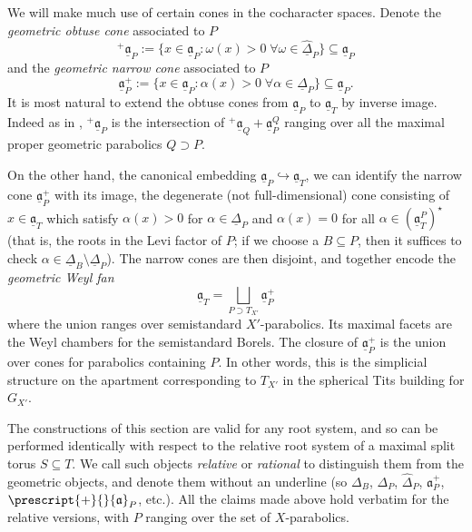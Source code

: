 \documentclass[openany]{amsbook}
\theoremstyle{definition}
\theoremstyle{remark}
\numberwithin{equation}{section}
\newcommand{\ul}[1]{\underline{#1}}
\renewcommand{\-}{\operatorname{-}}
\renewcommand{\a}{\mathfrak{a}}
\newcommand{\obtcone}{\prescript{+}{}{\a}}
\newcommand{\narcone}{\a^+}
\newcommand{\ga}{\ul{\a}}
\newcommand{\gobtcone}{{}^+ \ul{\a}}
\newcommand{\gnarcone}{\ul{\a}^+}
\begin{document}
We will make much use of certain cones in the cocharacter spaces. Denote the \emph{geometric obtuse cone} associated to $P$
$$
    \gobtcone_P := \{x \in \ga_P : \omega(x) > 0 \; \forall \omega \in \widehat{\ul{\Delta}}_P\} \subseteq \ga_P
$$
and the \emph{geometric narrow cone} associated to $P$
$$
    \gnarcone_P := \{x \in \ga_P : \alpha(x) > 0 \; \forall \alpha \in \ul{\Delta}_P\} \subseteq \ga_P.
$$
It is most natural to extend the obtuse cones from $\ga_P$ to $\ga_T$ by inverse image. Indeed as in \cite[Lemme 5.3.1]{CLI}, $\gobtcone_P$ is the intersection of $\gobtcone_Q + \ga_P^Q$ ranging over all the maximal proper geometric parabolics $Q \supset P$.

On the other hand, the canonical embedding $\ga_P \hookrightarrow \ga_T$, we can identify the narrow cone $\gnarcone_P$ with its image, the degenerate (not full-dimensional) cone consisting of $x \in \ga_T$ which satisfy $\alpha(x) > 0$ for $\alpha \in \ul{\Delta}_P$ and $\alpha(x) = 0$ for all $\alpha \in (\ga_T^P)^\star$ (that is, the roots in the Levi factor of $P$; if we choose a $B \subseteq P$, then it suffices to check $\alpha \in \ul{\Delta}_B \setminus \ul{\Delta}_P$). The narrow cones are then disjoint, and together encode the \emph{geometric Weyl fan}
$$
    \ga_T = \bigsqcup_{P \supset T_{X'}} \gnarcone_P
$$
where the union ranges over semistandard $X'$-parabolics. Its maximal facets are the Weyl chambers for the semistandard Borels. The closure of $\gnarcone_P$ is the union over cones for parabolics containing $P$. In other words, this is the simplicial structure on the apartment corresponding to $T_{X'}$ in the spherical Tits building for $G_{X'}$.

The constructions of this section are valid for any root system, and so can be performed identically with respect to the relative root system of a maximal split torus $S \subseteq T$. We call such objects \emph{relative} or \emph{rational} to distinguish them from the geometric objects, and denote them without an underline (so $\Delta_B$, $\Delta_P$, $\widehat{\Delta}_P$, $\narcone_P$, $\obtcone_P$, etc.). All the claims made above hold verbatim for the relative versions, with $P$ ranging over the set of $X$-parabolics.
\end{document}
